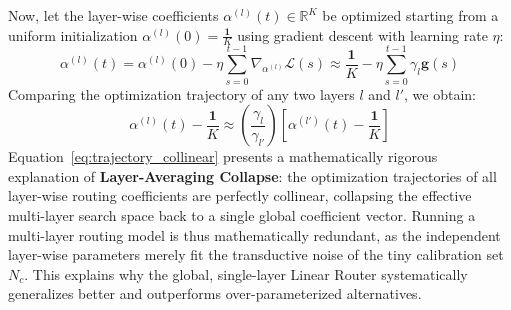 Now, let the layer-wise coefficients $\alpha^{(l)}(t) \in \mathbb{R}^K$ be optimized starting from a uniform initialization $\alpha^{(l)}(0) = \frac{\mathbf{1}}{K}$ using gradient descent with learning rate $\eta$:
\begin{equation}
\alpha^{(l)}(t) = \alpha^{(l)}(0) - \eta \sum_{s=0}^{t-1} \nabla_{\alpha^{(l)}} \mathcal{L}(s) \approx \frac{\mathbf{1}}{K} - \eta \sum_{s=0}^{t-1} \gamma_l \mathbf{g}(s)
\label{eq:trajectory}
\end{equation}
Comparing the optimization trajectory of any two layers $l$ and $l'$, we obtain:
\begin{equation}
\alpha^{(l)}(t) - \frac{\mathbf{1}}{K} \approx \left(\frac{\gamma_l}{\gamma_{l'}}\right) \left[ \alpha^{(l')}(t) - \frac{\mathbf{1}}{K} \right]
\label{eq:trajectory_collinear}
\end{equation}
Equation~\ref{eq:trajectory_collinear} presents a mathematically rigorous explanation of \textbf{Layer-Averaging Collapse}: the optimization trajectories of all layer-wise routing coefficients are perfectly collinear, collapsing the effective multi-layer search space back to a single global coefficient vector. Running a multi-layer routing model is thus mathematically redundant, as the independent layer-wise parameters merely fit the transductive noise of the tiny calibration set $N_c$. This explains why the global, single-layer Linear Router systematically generalizes better and outperforms over-parameterized alternatives.
